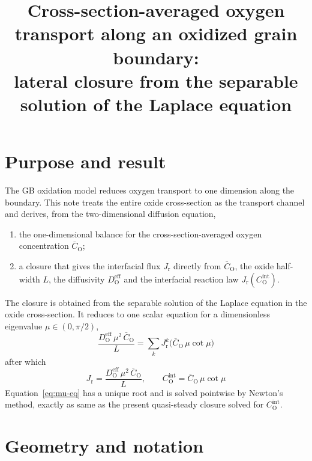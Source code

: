 \documentclass[12pt]{article}
\title{Cross-section-averaged oxygen transport along an oxidized grain boundary:\\
lateral closure from the separable solution of the Laplace equation}
\newcommand{\eff}{\mathrm{eff}}
\newcommand{\intf}{\mathrm{int}}
\newcommand{\Ox}{\mathrm{O}}
\newcommand{\D}{D_{\Ox}^{\eff}}
\newcommand{\Cb}{\bar{C}_{\Ox}}
\newcommand{\Ci}{C_{\Ox}^{\intf}}
\newcommand{\Jr}{J_{\mathrm{r}}}
\begin{document}
\maketitle

\section*{Purpose and result}

The GB oxidation model reduces oxygen transport to one dimension
along the boundary. This note treats the entire oxide cross-section as the
transport channel and derives, from the two-dimensional diffusion equation,
\begin{enumerate}
  \item[(i)] the one-dimensional balance for the cross-section-averaged oxygen
        concentration $\Cb$;
  \item[(ii)] a closure that gives the interfacial flux $\Jr$ directly from $\Cb$, the
        oxide half-width $L$, the diffusivity $\D$ and the interfacial reaction law
        $\Jr(\Ci)$.
\end{enumerate}
The closure is obtained from the separable solution of the Laplace equation in the
oxide cross-section. It reduces to one scalar equation for a dimensionless
eigenvalue $\mu\in(0,\pi/2)$,
\begin{equation}
\boxed{\;
\frac{\D\,\mu^{2}\,\Cb}{L}
 =\sum_k \Jr^{k}\!\bigl(\Cb\,\mu\cot\mu\bigr)
\;}
\label{eq:mu-eq}
\end{equation}
after which
\begin{equation}
\boxed{\;
\Jr=\frac{\D\,\mu^{2}\,\Cb}{L},
\qquad
\Ci=\Cb\,\mu\cot\mu
\;}
\label{eq:result}
\end{equation}
Equation~\eqref{eq:mu-eq} has a unique root and is solved pointwise by Newton's method,
exactly as same as the present quasi-steady closure solved for $\Ci$.

\section{Geometry and notation}
\label{sec:notation}
\end{document}
